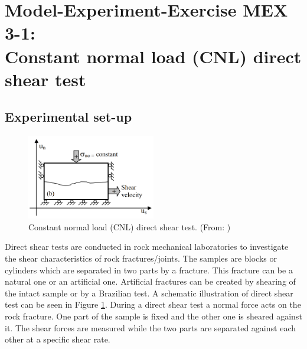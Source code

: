 \section[MEX 3-1: CNL direct shear test]{Model-Experiment-Exercise MEX 3-1:\\Constant normal load (CNL) direct shear test}
\label{sec:mex07}
\subsection{Experimental set-up}
\begin{figure}[!ht]
\begin{center}
\includegraphics[width=0.5\textwidth]{./figures/MEX7_CNL_Nguyen_Thesis.PNG}
\end{center}
\caption{Constant normal load (CNL) direct shear test. (From: \cite{Nguyen2014})}
\label{fig:MEX7_CNL}
\end{figure}
Direct shear tests are conducted in rock mechanical laboratories to investigate the shear characteristics of rock fractures/joints. The samples are blocks or cylin\-ders which are separated in two parts by a fracture. This fracture can be a natural one or an artificial one. Artificial fractures can be created by shearing of the intact sample or by a Brazilian test.
%
A schematic illustration of direct shear test can be seen in Figure \ref{fig:MEX7_CNL}. During a direct shear test a normal force acts on the rock fracture. One part of the sample is fixed and the other one is sheared against it. The shear forces are measured while the two parts are separated against each other at a specific shear rate.

